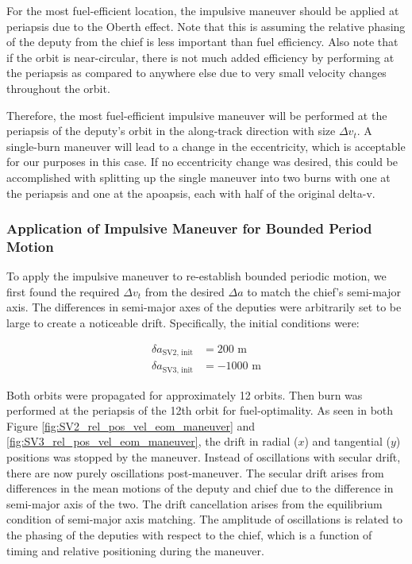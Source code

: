 For the most fuel-efficient location, the impulsive maneuver should be applied at periapsis due to the Oberth effect. Note that this is assuming the relative phasing of the deputy from the chief is less important than fuel efficiency. Also note that if the orbit is near-circular, there is not much added efficiency by performing at the periapsis as compared to anywhere else due to very small velocity changes throughout the orbit.

Therefore, the most fuel-efficient impulsive maneuver will be performed at the periapsis of the deputy's orbit in the along-track direction with size $\Delta v_t$. A single-burn maneuver will lead to a change in the eccentricity, which is acceptable for our purposes in this case. If no eccentricity change was desired, this could be accomplished with splitting up the single maneuver into two burns with one at the periapsis and one at the apoapsis, each with half of the original delta-v. 

\subsubsection{Application of Impulsive Maneuver for Bounded Period Motion}
To apply the impulsive maneuver to re-establish bounded periodic motion, we first found the required $\Delta v_t$ from the desired $\Delta a$ to match the chief's semi-major axis. The differences in semi-major axes of the deputies were arbitrarily set to be large to create a noticeable drift. Specifically, the initial conditions were:

\begin{align*}
\delta a_{\text{SV2, init}} &= 200 \text{ m} \\
\delta a_{\text{SV3, init}}  &= -1000 \text{ m}
\end{align*}

Both orbits were propagated for approximately 12 orbits. Then burn was performed at the periapsis of the 12th orbit for fuel-optimality. As seen in both Figure \ref{fig:SV2_rel_pos_vel_eom_maneuver} and \ref{fig:SV3_rel_pos_vel_eom_maneuver}, the drift in radial ($x$) and tangential ($y$) positions was stopped by the maneuver. Instead of oscillations with secular drift, there are now purely oscillations post-maneuver. The secular drift arises from differences in the mean motions of the deputy and chief due to the difference in semi-major axis of the two. The drift cancellation arises from the equilibrium condition of semi-major axis matching. The amplitude of oscillations is related to the phasing of the deputies with respect to the chief, which is a function of timing and relative positioning during the maneuver. 


